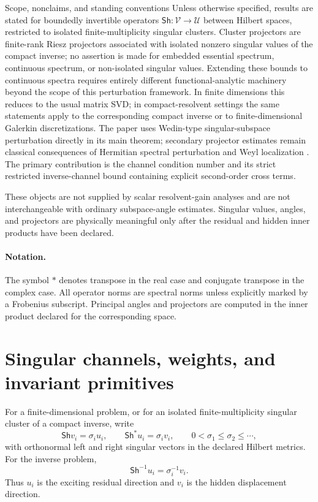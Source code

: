\documentclass[review]{siamart220329}
\theoremstyle{definition}
\theoremstyle{remark}
\newcommand{\calU}{\mathcal{U}}
\newcommand{\calV}{\mathcal{V}}
\newcommand{\Sh}{\mathsf{Sh}}
\begin{document}
\begin{siambox}{Scope, nonclaims, and standing conventions}
Unless otherwise specified, results are stated for boundedly invertible operators $\Sh:\calV\to\calU$ between Hilbert spaces, restricted to isolated finite-multiplicity singular clusters. Cluster projectors are finite-rank Riesz projectors associated with isolated nonzero singular values of the compact inverse; no assertion is made for embedded essential spectrum, continuous spectrum, or non-isolated singular values. Extending these bounds to continuous spectra requires entirely different functional-analytic machinery beyond the scope of this perturbation framework. In finite dimensions this reduces to the usual matrix SVD; in compact-resolvent settings the same statements apply to the corresponding compact inverse or to finite-dimensional Galerkin discretizations. The paper uses Wedin-type singular-subspace perturbation directly in its main theorem; secondary projector estimates remain classical consequences of Hermitian spectral perturbation and Weyl localization \cite{DavisKahan1970,StewartSun1990}. The primary contribution is the channel condition number and its strict restricted inverse-channel bound containing explicit second-order cross terms.

These objects are not supplied by scalar resolvent-gain analyses and are not interchangeable with ordinary subspace-angle estimates. Singular values, angles, and projectors are physically meaningful only after the residual and hidden inner products have been declared.
\end{siambox}

\paragraph{Notation.}
The symbol $*$ denotes transpose in the real case and conjugate transpose in the complex case. All operator norms are spectral norms unless explicitly marked by a Frobenius subscript. Principal angles and projectors are computed in the inner product declared for the corresponding space.

\section{Singular channels, weights, and invariant primitives}\label{sec:primitives}

For a finite-dimensional problem, or for an isolated finite-multiplicity singular cluster of a compact inverse, write
\begin{equation}
    \Sh v_i=\sigma_i u_i,
    \qquad
    \Sh^*u_i=\sigma_i v_i,
    \qquad
    0<\sigma_1\leq\sigma_2\leq\cdots,
    \label{eq:svd}
\end{equation}
with orthonormal left and right singular vectors in the declared Hilbert metrics. For the inverse problem,
\begin{equation}
    \Sh^{-1}u_i=\sigma_i^{-1}v_i.
    \label{eq:inverse-action}
\end{equation}
Thus $u_i$ is the exciting residual direction and $v_i$ is the hidden displacement direction.
\end{document}
